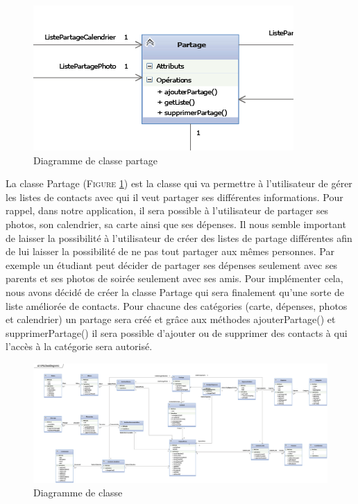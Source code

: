 \documentclass[11pt]{article}
\begin{document}
\begin{figure}[!h]
        \centering \includegraphics[scale=2]{partage.png}
        \caption{Diagramme de classe partage}
         \label{fig:partage}
\end{figure}

La classe Partage (\textsc{Figure \ref{fig:partage}}) est la classe qui va permettre à l'utilisateur de gérer les listes de contacts avec qui il veut partager ses différentes informations. 
Pour rappel, dans notre application, il sera possible à l'utilisateur de partager ses photos, son calendrier, sa carte ainsi que ses dépenses. Il nous semble important de laisser la possibilité à l'utilisateur de créer des listes de partage différentes afin de lui laisser la possibilité de ne pas tout partager aux mêmes personnes. Par exemple un étudiant peut décider de partager ses dépenses seulement avec ses parents et ses photos de soirée seulement avec ses amis. 
Pour implémenter cela, nous avons décidé de créer la classe Partage qui sera finalement qu'une sorte de liste améliorée de contacts. Pour chacune des catégories (carte, dépenses, photos et calendrier) un partage sera créé et grâce aux méthodes ajouterPartage() et supprimerPartage() il sera possible d'ajouter ou de supprimer des contacts à qui l'accès à la catégorie sera autorisé.

\newpage
\begin{figure}[!h]
        \centering \includegraphics[scale=0.9]{classe.png}
        \caption{Diagramme de classe}
         \label{fig:classe}
\end{figure}
\end{document}
